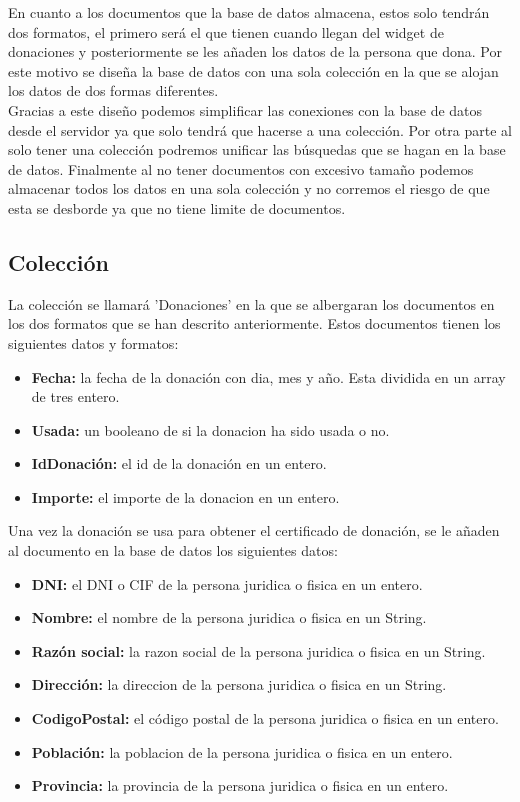 En cuanto a los documentos que la base de datos almacena, estos solo tendrán dos formatos, el primero será el que tienen cuando llegan del widget de donaciones y posteriormente se les añaden los datos de la persona que dona. Por este motivo se diseña la base de datos con una sola colección en la que se alojan los datos de dos formas diferentes.\\

Gracias a este diseño podemos simplificar las conexiones con la base de datos desde el servidor ya que solo tendrá que hacerse a una colección. Por otra parte al solo tener una colección podremos unificar las búsquedas que se hagan en la base de datos. Finalmente al no tener documentos con excesivo tamaño podemos almacenar todos los datos en una sola colección y no corremos el riesgo de que esta se desborde ya que no tiene limite de documentos.

\subsection{Colección}

La colección se llamará 'Donaciones' en la que se albergaran los documentos en los dos formatos que se han descrito anteriormente. Estos documentos tienen los siguientes datos y formatos:

\begin{itemize}
	\item \textbf{Fecha:} la fecha de la donación con dia, mes y año. Esta dividida en un array de tres entero.
	\item \textbf{Usada:} un booleano de si la donacion ha sido usada o no. 
	\item \textbf{IdDonación:} el id de la donación en un entero.
	\item \textbf{Importe:} el importe de la donacion en un entero.
\end{itemize}

Una vez la donación se usa para obtener el certificado de donación, se le añaden al documento en la base de datos los siguientes datos:

\begin{itemize}
	\item \textbf{DNI:} el DNI o CIF de la persona juridica o fisica en un entero.
	\item \textbf{Nombre:} el nombre de la persona juridica o fisica en un String.
	\item \textbf{Razón social:} la razon social de la persona juridica o fisica en un String.
	\item \textbf{Dirección:} la direccion de la persona juridica o fisica en un String.
	\item \textbf{CodigoPostal:} el código postal de la persona juridica o fisica en un entero.
	\item \textbf{Población:} la poblacion de la persona juridica o fisica en un entero.
	\item \textbf{Provincia:} la provincia de la persona juridica o fisica en un entero.
\end{itemize}


